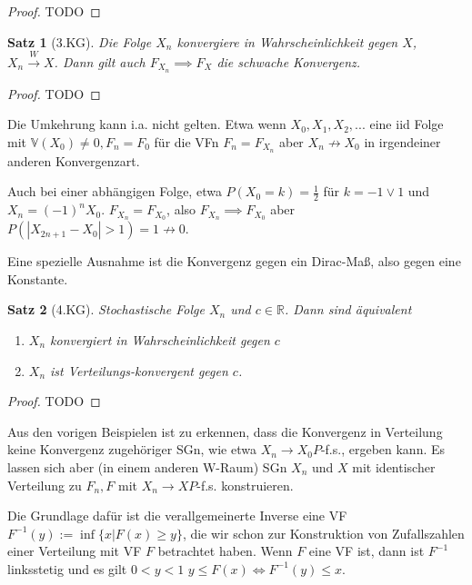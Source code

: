 \documentclass[]{article}
\newtheorem{theorem}{Satz}
\begin{document}
\begin{proof}
	TODO
\end{proof}

\begin{theorem}[3.KG]
	Die Folge $X_n$ konvergiere in Wahrscheinlichkeit gegen $X$, $X_n\xrightarrow{W}X$. Dann gilt auch $F_{X_n}\implies F_X$ die schwache Konvergenz.
\end{theorem}

\begin{proof}
	TODO
\end{proof}

Die Umkehrung kann i.a. nicht gelten. Etwa wenn $X_0, X_1, X_2, ...$ eine iid Folge mit $\mathbb{V}(X_0) \neq 0, F_n=F_0$ für die VFn $F_n=F_{X_n}$ aber $X_n \not\rightarrow X_0$ in irgendeiner anderen Konvergenzart.

Auch bei einer abhängigen Folge, etwa $P(X_0=k)=\frac{1}{2}$ für $k=-1 \lor 1$ und $X_n=(-1)^nX_0$. $F_{X_n}=F_{X_0}$, also $F_{X_n}\implies F_{X_0}$ aber $P(|X_{2n+1} - X_0|>1)=1 \not\rightarrow 0$.

Eine spezielle Ausnahme ist die Konvergenz gegen ein Dirac-Maß, also gegen eine Konstante.

\begin{theorem}[4.KG]
	Stochastische Folge $X_n$ und $c\in \mathbb{R}$. Dann sind äquivalent
	\begin{enumerate}
		\item $X_n$ konvergiert in Wahrscheinlichkeit gegen $c$
		\item $X_n$ ist Verteilungs-konvergent gegen $c$.
	\end{enumerate}
\end{theorem}

\begin{proof}
	TODO
\end{proof}

Aus den vorigen Beispielen ist zu erkennen, dass die Konvergenz in Verteilung keine Konvergenz zugehöriger SGn, wie etwa $X_n \rightarrow X_0 P$-f.s., ergeben kann. Es lassen sich aber (in einem anderen W-Raum) SGn $X_n$ und $X$ mit identischer Verteilung zu $F_n, F$ mit $X_n \rightarrow X P$-f.s. konstruieren.

Die Grundlage dafür ist die verallgemeinerte Inverse eine VF $F^{-1}(y):= \inf\{x| F(x) \geq y\}$, die wir schon zur Konstruktion von Zufallszahlen einer Verteilung mit VF $F$ betrachtet haben. Wenn $F$ eine VF ist, dann ist $F^{-1}$ linksstetig und es gilt $0 < y < 1$ $y \leq F(x) \iff F^{-1}(y) \leq x$.
\end{document}
